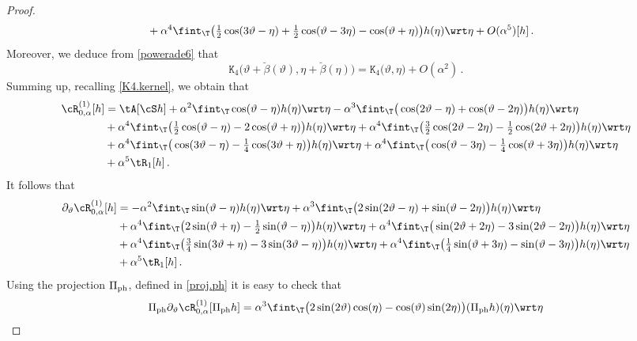 \documentclass[a4paper,reqno,10pt]{article}
\newcommand{\pa}{\partial}
\begin{document}
\begin{proof}
\begin{align*}
		& + \alpha^4 \fint_{\T} \big( \tfrac12 \cos(3\vartheta-\eta)  + \tfrac12 \cos(\vartheta-3\eta) - \cos(\vartheta+\eta) \big)  h(\eta) \wrt\eta  + O(\alpha^5)[h]\,.
	\end{align*}
	Moreover, we deduce from \eqref{powerade6} that
	$$
	\mathtt{K}_4\big(\vartheta+\breve{\beta}(\vartheta), \eta+\breve{\beta}(\eta) \big)=\mathtt{K}_4\big(\vartheta, \eta \big)+O(\alpha^2)\,.
	$$
	Summing up, recalling \eqref{K4.kernel}, we obtain that 
	\begin{align}
		\cR_{0,\alpha}^{(1)} [h]&  = \tA[\cS h] +	 \alpha^2\fint_{\T}\cos(\vartheta-\eta) h(\eta) \wrt \eta    - \alpha^3 \fint_{\T}\big( \cos(2\vartheta-\eta) + \cos(\vartheta-2\eta) \big)h(\eta) \wrt \eta    \\
		&+\alpha^4\fint_{\T} \big( \tfrac12 \cos(\vartheta-\eta) - 2\cos(\vartheta+\eta)\big)h(\eta) \wrt\eta   +\alpha^4\fint_{\T} \big(\tfrac32\cos(2\vartheta-2\eta)  -\tfrac12\cos(2\vartheta+2\eta)\big) h(\eta) \wrt\eta \\
		&   +\alpha^4\fint_{\T} \big(\cos(3\vartheta-\eta) -\tfrac14\cos(3\vartheta+\eta) \big)h(\eta) \wrt\eta +\alpha^4\fint_{\T} \big( \cos(\vartheta-3\eta)-\tfrac14\cos(\vartheta+3\eta) \big)h(\eta) \wrt\eta \\
		& + \alpha^5 \tR_{1}[h] \,.
	\end{align} 
	It follows that
	\begin{align}
		 \pa_{\vartheta} \cR_{0,\alpha}^{(1)} [h]  &= 	- \alpha^2\fint_{\T}\sin(\vartheta-\eta) h(\eta) \wrt \eta    + \alpha^3 \fint_{\T}\big( 2\sin(2\vartheta-\eta) + \sin(\vartheta-2\eta) \big)h(\eta) \wrt \eta    \\
			 &+\alpha^4\fint_{\T} \big( 2 \sin(\vartheta+\eta) -\tfrac12 \sin(\vartheta-\eta)\big)h(\eta) \wrt\eta   +\alpha^4\fint_{\T} \big(\sin(2\vartheta+2\eta)  -3\sin(2\vartheta-2\eta)\big) h(\eta) \wrt\eta \\
			  &+\alpha^4\fint_{\T} \big(\tfrac34 \sin(3\vartheta+\eta) -3\sin(3\vartheta-\eta) \big)h(\eta) \wrt\eta +\alpha^4\fint_{\T} \big( \tfrac14 \sin(\vartheta+3\eta)-\sin(\vartheta-3\eta) \big)h(\eta) \wrt\eta\\
	 &+\alpha^5 \tR_{1}[h] \,. \label{leone02}
	\end{align} 
	Using the projection $\Pi_{\rm ph}$, defined in \eqref{proj.ph} it is easy to check that
	\begin{align} 	
		&	\Pi_{\rm ph}\pa_{\vartheta} \cR_{0,\alpha}^{(1)} [\Pi_{\rm ph} h]  = \alpha^3 \fint_{\T}\big( 2\sin(2\vartheta)\cos(\eta) -\cos(\vartheta) \sin(2\eta) \big) (\Pi_{\rm ph} h) (\eta) \wrt \eta    \\

\end{align}
\end{proof}
\end{document}
